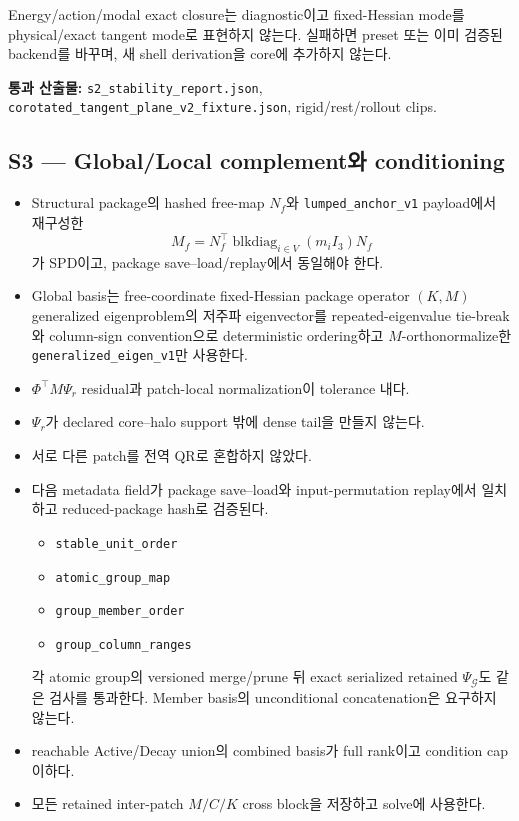 \documentclass[10pt]{article}
\newcommand{\code}[1]{{\small\nolinkurl{#1}}}
\newcommand{\pass}[1]{\textcolor{GateGreen}{\textbf{#1}}}
\begin{document}
Energy/action/modal exact closure는 diagnostic이고 fixed-Hessian mode를 physical/exact tangent mode로
표현하지 않는다. 실패하면 preset 또는 이미 검증된 backend를 바꾸며,
새 shell derivation을 core에 추가하지 않는다.

\pass{통과 산출물:} \code{s2\_stability\_report.json},
\code{corotated\_tangent\_plane\_v2\_fixture.json}, rigid/rest/rollout clips.

\subsection{S3 --- Global/Local complement와 conditioning}

\begin{itemize}
  \item [\(\square\)] Structural package의 hashed free-map \(N_f\)와
  \code{lumped\_anchor\_v1} payload에서 재구성한
  \[
    M_f=N_f^\top\operatorname{blkdiag}_{i\in V}(m_iI_3)N_f
  \]
  가 SPD이고,
  package save--load/replay에서 동일해야 한다.
  \item [\(\square\)] Global basis는 free-coordinate fixed-Hessian package operator \((K,M)\)
  generalized eigenproblem의
  저주파 eigenvector를 repeated-eigenvalue tie-break와 column-sign convention으로
  deterministic ordering하고 \(M\)-orthonormalize한 \code{generalized\_eigen\_v1}만 사용한다.
  \item [\(\square\)] \(\Phi^\top M\Psi_r\) residual과 patch-local normalization이 tolerance 내다.
  \item [\(\square\)] \(\Psi_r\)가 declared core--halo support 밖에 dense tail을 만들지 않는다.
  \item [\(\square\)] 서로 다른 patch를 전역 QR로 혼합하지 않았다.
  \item [\(\square\)] 다음 metadata field가 package save--load와
  input-permutation replay에서 일치하고 reduced-package hash로 검증된다.
  \begin{itemize}
    \item \code{stable\_unit\_order}
    \item \code{atomic\_group\_map}
    \item \code{group\_member\_order}
    \item \code{group\_column\_ranges}
  \end{itemize}
  각 atomic group의 versioned merge/prune 뒤 exact serialized retained
  \(\Psi_{\mathcal G}\)도 같은 검사를 통과한다.
  Member basis의 unconditional concatenation은 요구하지 않는다.
  \item [\(\square\)] reachable Active/Decay union의 combined basis가 full rank이고 condition cap 이하다.
  \item [\(\square\)] 모든 retained inter-patch \(M/C/K\) cross block을 저장하고 solve에 사용한다.
\end{itemize}
\end{document}

